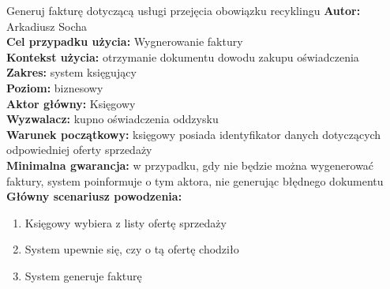 	\begin{usecase}{Generuj fakturę dotyczącą usługi przejęcia obowiązku recyklingu}
		\textbf{Autor:} Arkadiusz Socha\\
		\textbf{Cel przypadku użycia:} Wygnerowanie faktury \\
		\textbf{Kontekst użycia:} otrzymanie dokumentu dowodu zakupu oświadczenia  \\
		\textbf{Zakres:} system księgujący \\
		\textbf{Poziom:} biznesowy \\
		\textbf{Aktor główny:} Księgowy \\
		\textbf{Wyzwalacz:} kupno oświadczenia oddzysku \\
		\textbf{Warunek początkowy:} księgowy posiada identyfikator danych dotyczących odpowiedniej oferty sprzedaży \\
		\textbf{Minimalna gwarancja:} w przypadku, gdy nie będzie można wygenerować faktury, system poinformuje o tym aktora, nie generując błędnego dokumentu \\
		\textbf{Główny scenariusz powodzenia:} 
			\begin{enumerate}
				\item Księgowy wybiera z listy ofertę sprzedaży
				\item System upewnie się, czy o tą ofertę chodziło
				\item System generuje fakturę 
			\end{enumerate}
	\end{usecase}


